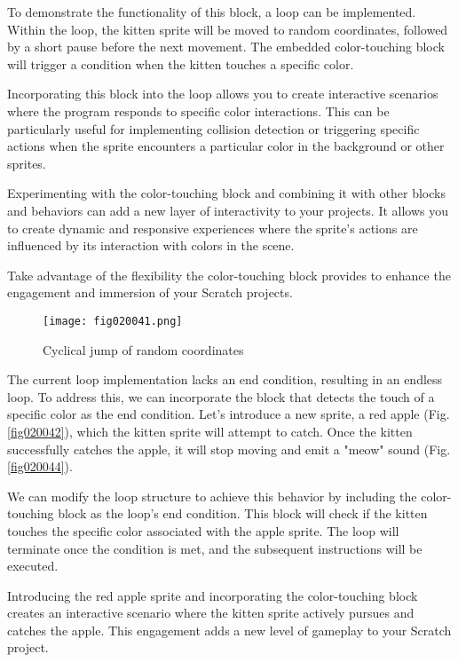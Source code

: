 To demonstrate the functionality of this block, a loop can be implemented. Within the loop, the kitten sprite will be moved to random coordinates, followed by a short pause before the next movement. The embedded color-touching block will trigger a condition when the kitten touches a specific color.

Incorporating this block into the loop allows you to create interactive scenarios where the program responds to specific color interactions. This can be particularly useful for implementing collision detection or triggering specific actions when the sprite encounters a particular color in the background or other sprites.

Experimenting with the color-touching block and combining it with other blocks and behaviors can add a new layer of interactivity to your projects. It allows you to create dynamic and responsive experiences where the sprite's actions are influenced by its interaction with colors in the scene.

Take advantage of the flexibility the color-touching block provides to enhance the engagement and immersion of your Scratch projects.

\begin{figure}[H]
   \centering
   \texttt{[image: fig020041.png]}
   \caption{Cyclical jump of random coordinates}
\label{fig020041}
\end{figure}

The current loop implementation lacks an end condition, resulting in an endless loop. To address this, we can incorporate the block that detects the touch of a specific color as the end condition. Let's introduce a new sprite, a red apple (Fig. \ref{fig020042}), which the kitten sprite will attempt to catch. Once the kitten successfully catches the apple, it will stop moving and emit a "meow" sound (Fig. \ref{fig020044}).

We can modify the loop structure to achieve this behavior by including the color-touching block as the loop's end condition. This block will check if the kitten touches the specific color associated with the apple sprite. The loop will terminate once the condition is met, and the subsequent instructions will be executed.

Introducing the red apple sprite and incorporating the color-touching block creates an interactive scenario where the kitten sprite actively pursues and catches the apple. This engagement adds a new level of gameplay to your Scratch project.


